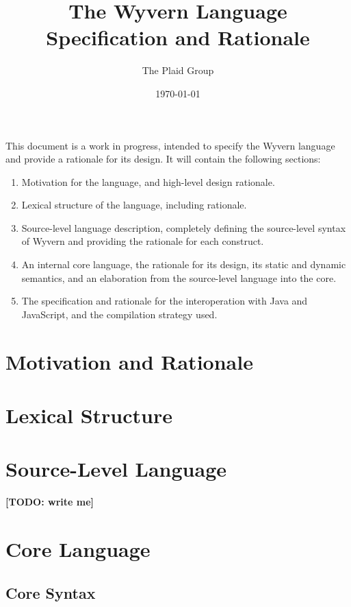 \documentclass[11pt]{article}
\title{The Wyvern Language\\
Specification and Rationale}
\author{The Plaid Group}
\date{\today}
\newcommand{\TODO}[1]{\textbf{[TODO: #1]}}
\begin{document}
\begin{sloppypar}

\maketitle

This document is a work in progress, intended to specify the Wyvern language and provide a rationale for its design.  It will contain the following sections:

\begin{enumerate}

\item Motivation for the language, and high-level design rationale.

\item Lexical structure of the language, including rationale.

\item Source-level language description, completely defining the source-level syntax of Wyvern and providing the rationale for each construct.

\item An internal core language, the rationale for its design, its static and dynamic semantics, and an elaboration from the source-level language into the core.

\item The specification and rationale for the interoperation with Java and JavaScript, and the compilation strategy used.

\end{enumerate}

\section{Motivation and Rationale}
\section{Lexical Structure}
\section{Source-Level Language}
\TODO{write me}

\section{Core Language}

\subsection{Core Syntax}



\end{sloppypar}
\end{document}
